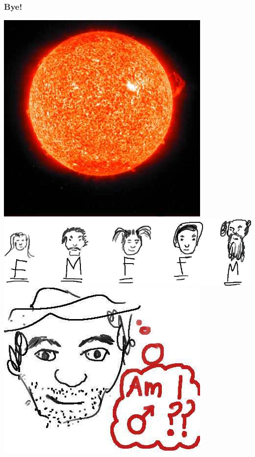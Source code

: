 \documentclass{beamer}
\begin{document}
\begin{frame}
\frametitle{Bye!}
\includegraphics[scale=.5]{images/sun.jpg}
\includegraphics[scale=0.25]{images/classifiedFaces.jpg}
\includegraphics[scale=0.065]{images/maleFace.jpg}
\end{frame}

% 
% 
\end{document}
